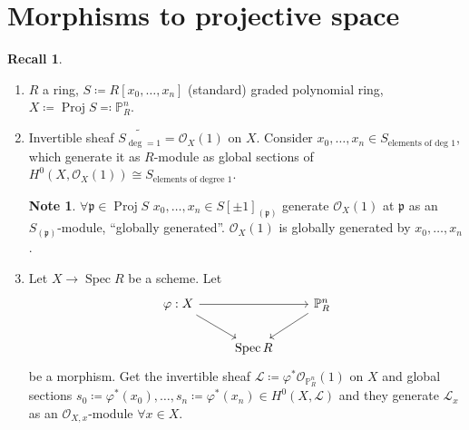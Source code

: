 \documentclass[12pt]{article}
\DeclareMathOperator{\Spec}{Spec}
\DeclareMathOperator{\Proj}{Proj}
\theoremstyle{definition}
\newtheorem*{note}{Note}
\newtheorem*{recall}{Recall}
\theoremstyle{remark}
\newtheorem*{comment}{Comment}
\begin{document}
\section{Morphisms to projective space}
\begin{recall}
\begin{enumerate}[label=\arabic*)]
\item $R$ a ring, $S\coloneqq R[x_0,\ldots,x_n]$ (standard) graded polynomial ring, $X\coloneqq\Proj S\eqqcolon\mathbb{P}_R^n$.

\item Invertible sheaf $\widetilde{S_{\deg=1}}=\mathcal{O}_X(1)$ on $X$. Consider $x_0,\ldots,x_n\in S_{\text{elements of deg }1}$, which generate it as $R$-module as global sections of $H^0(X,\mathcal{O}_X(1))\cong S_{\text{elements of degree }1}$.

\begin{note}
$\forall\mathfrak{p}\in\Proj S$ $x_0,\ldots,x_n\in S[\pm1]_{(\mathfrak{p})}$ generate $\mathcal{O}_X(1)$ at $\mathfrak{p}$ as an $S_{(\mathfrak{p})}$-module, ``globally generated''. $\mathcal{O}_X(1)$ is globally generated by $x_0,\ldots,x_n$.
\end{note}

\begin{comment}
``Globally generated'' means that for all point there exists a hyperplane that doesn't go through it (in the case of the projective plane, hyperplanes are lines).
\end{comment}

\item Let $X\rightarrow\Spec R$ be a scheme. Let
\[
\begin{tikzcd}
\varphi:X\arrow[rr]\arrow[rd]&&\mathbb{P}_R^n\arrow[ld]\\
&\Spec R
\end{tikzcd}
\]
be a morphism. Get the invertible sheaf $\mathcal{L}\coloneqq\varphi^*\mathcal{O}_{\mathbb{P}_R^n}(1)$ on $X$ and global sections $s_0\coloneqq\varphi^*(x_0),\ldots,s_n\coloneqq\varphi^*(x_n)\in H^0(X,\mathcal{L})$ and they generate $\mathcal{L}_x$ as an $\mathcal{O}_{X,x}$-module $\forall x\in X$.

\begin{comment}
If $X\subseteq\mathbb{P}_R^2$, the pull-back is just the line intersected with $X$. This means that the intersection of a line with a hyperplane is a finite set of points. In the case of the projective plane, given a straight line, all straight lines intersect it in a single point, except for itself, as it intersects itself in infinitely many points, but itself is not a divisor, as it is the whole line.
\end{comment}
\end{enumerate}
\end{recall}
\end{document}
